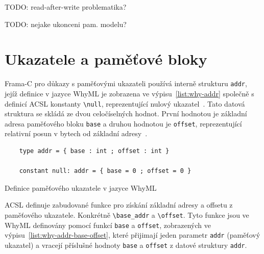 TODO: read-after-write problematika?

TODO: nejake ukonceni pam. modelu?




\section{Ukazatele a paměťové bloky}
\label{sec:ukazatele-a-pametove-bloky}

Frama\mbox{-}C pro důkazy s paměťovými ukazateli používá interně strukturu \texttt{addr},
jejíž definice v jazyce WhyML je zobrazena ve výpisu~\ref{list:why-addr}
společně s definicí ACSL konstanty \texttt{\textbackslash null},
reprezentující nulový ukazatel~\cite{FCGitWhy}.
Tato datová struktura se skládá ze dvou celočíselných hodnot.
První hodnotou je základní adresa paměťového bloku \texttt{base}
a druhou hodnotou je \texttt{offset}, reprezentující relativní posun v bytech od základní adresy~\cite{BlanchardWP2024}.


\begin{listing}[H]
    \begin{verbatim}
    type addr = { base : int ; offset : int }

    constant null: addr = { base = 0 ; offset = 0 }
    \end{verbatim}
    \caption{Definice paměťového ukazatele v jazyce WhyML}
    \label{list:why-addr}
\end{listing}

ACSL definuje zabudované funkce pro získání základní adresy a offsetu z paměťového ukazatele.
Konkrétně \texttt{\textbackslash base\_addr} a \texttt{\textbackslash offset}.
Tyto funkce jsou ve WhyML definovány pomocí funkcí \texttt{base} a \texttt{offset},
zobrazených ve výpisu~\ref{list:why-addr-base-offset},
které přijimají jeden parametr \texttt{addr} (paměťový ukazatel)
a vracejí příslušné hodnoty \texttt{base} a \texttt{offset} z datové struktury \texttt{addr}.

